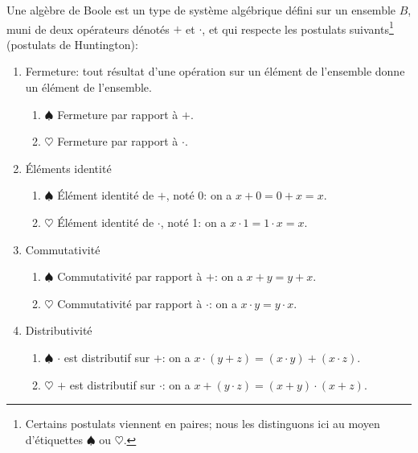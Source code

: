 \documentclass[letter, oneside]{book}
\begin{document}
Une algèbre de Boole est un type de système algébrique défini sur un
ensemble \(B\), muni de deux opérateurs dénotés \(+\) et \(\cdot\), et qui
respecte les postulats suivants\footnote{Certains postulats viennent en paires; nous les distinguons ici au
moyen d'étiquettes \(\spadesuit\) ou \(\heartsuit\).} (postulats de Huntington):

\begin{enumerate}
\item Fermeture: tout résultat d'une opération sur un élément de
l'ensemble donne un élément de l'ensemble.

\begin{enumerate}
\item \(\spadesuit\) Fermeture par rapport à \(+\).

\item \(\heartsuit\) Fermeture par rapport à \(\cdot\).
\end{enumerate}

\item Éléments identité

\begin{enumerate}
\item \(\spadesuit\) Élément identité de \(+\), noté 0: on a \(x + 0 = 0 + x = x\).

\item \(\heartsuit\) Élément identité de \(\cdot\), noté 1: on a \(x \cdot 1 = 1 \cdot x = x\).
\end{enumerate}

\item Commutativité

\begin{enumerate}
\item \(\spadesuit\) Commutativité par rapport à \(+\): on a \(x + y = y + x\).

\item \(\heartsuit\) Commutativité par rapport à \(\cdot\): on a \(x \cdot y = y
        \cdot x\).
\end{enumerate}

\item Distributivité

\begin{enumerate}
\item \(\spadesuit\) \(\cdot\) est distributif sur \(+\): on a \(x \cdot (y + z)= (x \cdot y) +
        (x \cdot z)\).

\item \(\heartsuit\) \(+\) est distributif sur \(\cdot\): on a \(x + (y \cdot z)= (x + y) \cdot
        (x + z)\).
\end{enumerate}


\end{enumerate}
\end{document}
